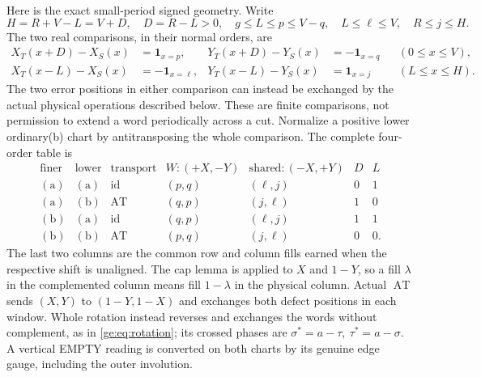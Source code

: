 \documentclass[11pt,a4paper]{amsart}
\numberwithin{equation}{section}
\theoremstyle{plain}
\theoremstyle{definition}
\newcommand{\one}{\mathbf1}
\newcommand{\AT}{\operatorname{AT}}
\begin{document}
Here is the exact small-period signed geometry.  Write
\begin{equation}\label{ge:eq:signed-parameters}
 H=R+V-L=V+D,\quad D=R-L>0,\quad
 g\le L\le p\le V-q,\quad L\le\ell\le V,
 \quad R\le j\le H.
\end{equation}
The two real comparisons, in their normal orders, are
\begin{align}
 X_T(x+D)-X_S(x)&=\one_{x=p},&
 Y_T(x+D)-Y_S(x)&=-\one_{x=q}&&(0\le x\le V),\label{ge:eq:signed-W}\\
 X_T(x-L)-X_S(x)&=-\one_{x=\ell},&
 Y_T(x-L)-Y_S(x)&=\one_{x=j}&&(L\le x\le H).\label{ge:eq:signed-G}
\end{align}
The two error positions in either comparison can instead be exchanged
by the actual physical operations described below.  These are finite
comparisons, not permission to extend a word periodically across a cut.
Normalize a positive lower ordinary(b) chart by antitransposing the
whole comparison.  The complete four-order table is
\begin{equation}\label{ge:eq:fill-table}
\begin{array}{cc|c|cc|cc}
\text{finer}&\text{lower}&\text{transport}
 &W:(+X,-Y)&\text{shared}:(-X,+Y)&D&L\\\hline
\mathrm{(a)}&\mathrm{(a)}&\mathrm{id}&(p,q)&(\ell,j)&0&1\\
\mathrm{(a)}&\mathrm{(b)}&\AT&(q,p)&(j,\ell)&1&0\\
\mathrm{(b)}&\mathrm{(a)}&\mathrm{id}&(q,p)&(\ell,j)&1&1\\
\mathrm{(b)}&\mathrm{(b)}&\AT&(p,q)&(j,\ell)&0&0.
\end{array}
\end{equation}
The last two columns are the common row and column fills earned
when the respective shift is unaligned.  The cap lemma is applied
to \(X\) and \(1-Y\), so a fill \(\lambda\) in the complemented
column means fill \(1-\lambda\) in the physical column.
Actual \(\AT\) sends \((X,Y)\) to \((1-Y,1-X)\) and exchanges
both defect positions in each window.  Whole rotation instead
reverses and exchanges the words without complement, as in
\eqref{ge:eq:rotation}; its crossed phases are
\(\sigma^*=a-\tau,\ \tau^*=a-\sigma\).
A vertical EMPTY reading is converted on both charts by its
genuine edge gauge, including the outer involution.
\end{document}
